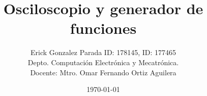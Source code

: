 \documentclass{article}
\begin{document}

\renewcommand{\footrulewidth}{1pt}
\renewcommand{\tablename}{Tabla}
\renewcommand{\figurename}{Figura}


\title{Osciloscopio y generador de funciones}
\author{\small{Erick Gonzalez Parada ID: 178145, ID: 177465}\\ 
\small{ Depto. Computación Electrónica y Mecatrónica.} \\
\small {Docente: Mtro. Omar Fernando Ortiz Aguilera}}
\date{\small{\today}}

\maketitle

\end{document}
